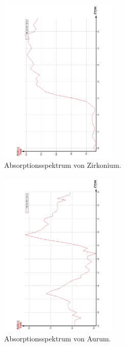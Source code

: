 \begin{figure}
  \centering
  \includegraphics[width=0.5\textwidth, angle=270]{bilder/AbsorpZr.pdf}
  \caption{Absorptionsspektrum von Zirkonium.}
  \label{fig:Zirkonium}
\end{figure}
\begin{figure}
  \centering
  \includegraphics[width=0.5\textwidth, angle=270]{bilder/AbsorpAu.pdf}
  \caption{Absorptionsspektrum von Aurum.}
  \label{fig:Aurum}
\end{figure}

